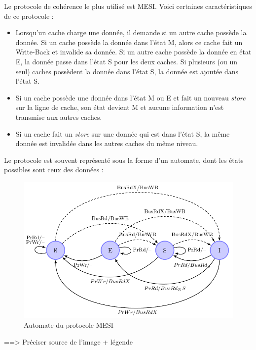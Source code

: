Le protocole de cohérence le plus utilisé est MESI. Voici certaines caractéristiques de ce protocole : \\
\begin{itemize}
\item Lorsqu'un cache charge une donnée, il demande si un autre cache possède la donnée. Si un cache possède la donnée dans l'état M, alors ce cache fait un Write-Back et invalide sa donnée. Si un autre cache possède la donnée en état E, la donnée passe dans l'état S pour les deux caches. Si plusieurs (ou un seul) caches possèdent la donnée dans l'état S, la donnée est ajoutée dans l'état S.
\item Si un cache possède une donnée dans l'état M ou E et fait un nouveau \textit{store} sur la ligne de cache, son état devient M et aucune information n'est transmise aux autres caches.
\item Si un cache fait un \textit{store} sur une donnée qui est dans l'état S, la même donnée est invalidée dans les autres caches du même niveau. \\
\end{itemize}

Le protocole est souvent représenté sous la forme d'un automate, dont les états possibles sont ceux des données : \\

\begin{figure}[!h]
\begin{center}
   \includegraphics[scale=0.45]{mesi.png}
   \caption{\label{img:mesi} Automate du protocole MESI}
\end{center}
\end{figure}

==> Préciser source de l'image + légende\\

